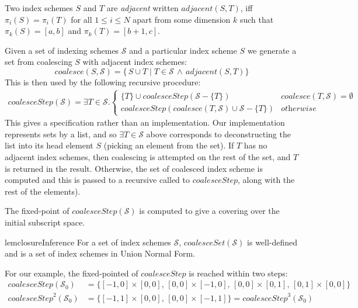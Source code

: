 \newcommand{\contig}[2]{\mathit{adjacent}(#1, #2)}
\begin{defn}[Adjacent]
  \label{def:contiguity}
  Two index schemes $S$ and $T$ are \emph{adjacent} written
  $\contig{S}{T}$, iff $\pi_i(S) = \pi_i(T)$ for all $1 \leq i \leq N$
  apart from some dimension $k$ such that $\pi_k(S) = [a, b]$ and
  $\pi_k(T) = [b+1, c]$.
\end{defn}
%
Given a set of indexing schemes $\mathcal{S}$ and a particular index scheme $S$
we generate a set from coalescing $S$ with adjacent index schemes:
%
\begin{equation*}
\mathit{coalesce}(S, \mathcal{S}) = 
  \{\,S \cup T \mid T \in \mathcal{S} \, \wedge \,
  \contig{S}{T} \}
\end{equation*}
%
This is then used by the following recursive procedure:
%
\begin{align*}
  \mathit{coalesceStep}(\mathcal{S}) =
  \exists T \in \mathcal{S} . 
  \begin{cases}
    \{T\} \cup \mathit{coalesceStep}(\mathcal{S} - \{T\}) &
    \mathit{coalesce}(T, \mathcal{S}) = \emptyset \\
    \mathit{coalesceStep}(\mathit{coalesce}(T, \mathcal{S}) \cup
                                        \mathcal{S} - \{T\}) & \textit{otherwise}
  \end{cases}
\end{align*}
%
This gives a specification rather than an implementation. Our
implementation represents sets by a list, and so
$\exists T \in \mathcal{S}$ above corresponds to deconstructing
the list into its head element $S$ (picking an element from the set).
If $T$ has no adjacent index schemes, then coalescing is attempted on
the rest of the set, and $T$ is returned in the result. Otherwise,
the set of coalesced index scheme is computed and this is passed to
a recursive called to $\mathit{coalesceStep}$, along with the rest of
the elements).

The fixed-point of $\textit{coalesceStep}(\mathcal{S})$ is computed to
give a covering over the initial subscript space.
%
\begin{restatable}{lem}{closureInference}
  \label{lem:closuer-inference}
  For a set of index schemes $\mathcal{S}$,
  $\mathit{coalesceSet}(\mathcal{S})$ is well-defined and is a set of
  index schemes in Union Normal Form.
\end{restatable}
%
For our example, the fixed-pointed of $\mathit{coalesceStep}$ is reached within two
steps:
%
\begin{align*}
  \mathit{coalesceStep}(\mathcal{S}_0) & =
  \{[-1,0] \times [0,0],\,[0,0] \times [-1, 0],\,[0,0] \times
    [0,1],\,[0,1] \times [0,0]\} \\
  \mathit{coalesceStep}^2(\mathcal{S}_0) & =
  \{[-1, 1] \times [0, 0],\,[0, 0] \times [-1, 1]\} = \mathit{coalesceStep}^3(\mathcal{S}_0)
\end{align*}
%

